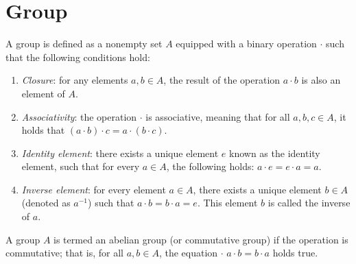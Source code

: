 \section{Group}

\begin{definition}
    A group is defined as a nonempty set $A$ equipped with a binary operation $\cdot$ such that the following conditions hold:
\end{definition}
\begin{enumerate}
    \item \textit{Closure}: for any elements $a, b \in A$, the result of the operation $a \cdot b$ is also an element of $A$.
    \item \textit{Associativity}: the operation $\cdot$ is associative, meaning that for all $a,b,c\in A$, it holds that $(a \cdot b) \cdot c = a \cdot (b \cdot c)$.
    \item \textit{Identity element}: there exists a unique element $e$ known as the identity element, such that for every $a\in A$, the following holds: $a \cdot e = e \cdot a = a$.
    \item \textit{Inverse element}: for every element $a \in A$, there exists a unique element $b \in A$ (denoted as $a^{-1}$) such that $a \cdot b = b \cdot a = e$. 
        This element $b$ is called the inverse of $a$.
\end{enumerate}
\begin{definition}
    A group $A$ is termed an abelian group (or commutative group) if the operation is commutative; that is, for all $a, b \in A$, the equation $\cdot$ $a \cdot b = b \cdot a$ holds true.
\end{definition}
